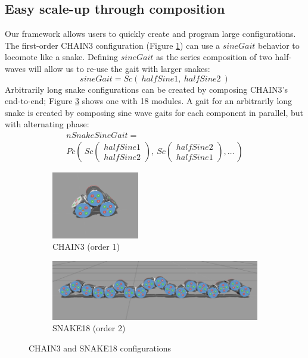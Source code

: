 \documentclass[conference]{IEEEtran}
\theoremstyle{definition}
\begin{document}
\subsection{Easy scale-up through composition}
Our framework allows users to quickly create and program large configurations. The
first-order CHAIN3 configuration (Figure \ref{fig:chain3}) can use a \(sineGait\)
behavior to locomote like a snake. Defining \(sineGait\)  as the series composition
of two half-waves will allow us to re-use the gait with larger snakes:
\begin{displaymath}
sineGait = Sc(~halfSine1,~halfSine2~)
\end{displaymath}
Arbitrarily long snake configurations can be created
by composing CHAIN3's end-to-end; Figure \ref{fig:snake18} shows one with 18 modules.
A gait for an arbitrarily long snake is created by composing sine wave
gaits for each component in parallel, but with alternating phase:
\begin{align*}
nSnakeSineGait = ~~~~~~~~~~~~~~~~~~~~~~~~~~~~~~~~~~~~~~~~~~\\
Pc \left(~Sc\begin{pmatrix} halfSine1 \\ halfSine2 \end{pmatrix},
~Sc\begin{pmatrix} halfSine2 \\ halfSine1 \end{pmatrix},\ldots ~\right)
\end{align*}

\begin{figure}
        \begin{subfigure}{\columnwidth}
        \begin{center}
                \includegraphics[width=1.5in]{images/library/snake3.png}
        \end{center}
                \caption{CHAIN3 (order 1)}
                \label{fig:chain3}
        \end{subfigure}
        \begin{subfigure}{\columnwidth}
                \includegraphics[width=\columnwidth]{images/library/snake18.png}
                \caption{SNAKE18 (order 2)}
                \label{fig:snake18}
        \end{subfigure}
\caption{CHAIN3 and SNAKE18 configurations}
\end{figure}
\end{document}
